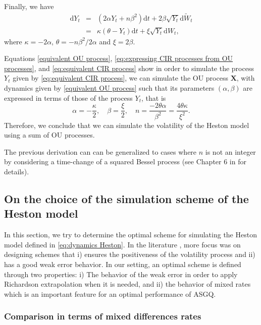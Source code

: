 \documentclass[11pt]{article}
\begin{document}
Finally, we have 
\begin{eqnarray}\label{eq:equivalent CIR process}
\mathrm{d}Y_t & = & \left( 2 \alpha Y_t + n \beta^2 \right) \mathrm{d}t + 2 \beta \sqrt{Y_t} \mathrm{d}\tilde{W}_t \nonumber\\
& = & \kappa \left( \theta - Y_t \right) \mathrm{d}t + \xi \sqrt{Y_t} \mathrm{d}W_t,
\end{eqnarray}
where $\kappa = -2 \alpha$, $\theta = -n \beta^2 / 2 \alpha$ and $\xi = 2 \beta$.

Equations \eqref{equivalent OU process}, \eqref{eq:expressing CIR processes from OU processes}, and \eqref{eq:equivalent CIR process} show  in order to simulate the process $Y_t$ given by \eqref{eq:equivalent CIR process}, we can  simulate the  OU process  $\mathbf{X}$, with dynamics given by \eqref{equivalent OU process} such that its parameters $(\alpha, \beta)$ are expressed in terms of  those of the  process $Y_t$, that is 
$$ \alpha=-\frac{\kappa}{2},\quad \beta=\frac{\xi}{2}, \quad n=\frac{-2 \theta \alpha}{\beta^2}=\frac{4 \theta  \kappa}{\xi^2}.$$ Therefore, we conclude that we can simulate the volatility of the Heston model using a sum of OU processes.

\begin{remark}
The previous derivation can can be generalized to cases where $n$ is not an integer by considering a time-change of a squared Bessel process (see Chapter 6 in \cite{jeanblanc2009mathematical} for details). 
\end{remark}

\subsection{On the choice of the simulation scheme of the Heston model}\label{sec:On the choice of the simulation scheme of the Heston model}
In this section, we try to determine the optimal  scheme for simulating the Heston model defined in \ref{eq:dynamics Heston}.  In the literature  \cite{andersen2007efficient, lord2010comparison,alfonsi2010high}, more focus was on designing schemes that i) ensures the positiveness  of the volatility process and ii) has a good weak error behavior. In our setting, an optimal scheme is defined through two properties: i) The behavior of the weak error in order to apply Richardson extrapolation when it is needed,  and ii) the behavior of mixed rates which is an important feature for an  optimal performance of ASGQ. 
\subsubsection{Comparison in terms of mixed differences rates}
\end{document}
